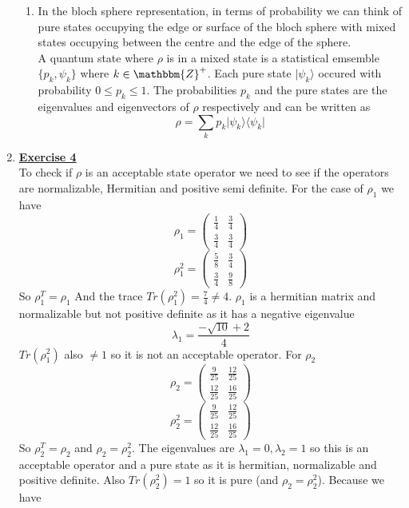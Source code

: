 \documentclass[12pt]{article}
\newcommand{\ket}[1]{\vert{#1}\rangle}
\newcommand{\bra}[1]{\langle{#1}\vert}
\begin{document}
\begin{enumerate}
\begin{enumerate}
    \item In the bloch sphere representation, in terms of probability we can think of pure states occupying the edge or surface of the bloch sphere with mixed states occupying between the centre and the edge of the sphere. 
    \\
    A quantum state where $\rho$ is in a mixed state is a statistical emsemble $\{p_k, \psi_k\}$ where $k \in \mathbbm{Z}^+$. Each pure state $\ket{\psi_k}$ occured with probability $ 0 \leq p_k \leq 1$.
    The probabilities $p_k$ and the pure states are the eigenvalues and eigenvectors of $\rho$ respectively and can be written as 
    $$ \rho = \sum_k p_k \ket{\psi_k}\bra{\psi_k} $$
\end{enumerate}



\item \textbf{\underline{Exercise 4}} \\
To check if $\rho$ is an acceptable state operator we need to see if the operators are normalizable, Hermitian and positive semi definite. For the case of $\rho_1$ we have 
$$ \rho_1 = \left(\begin{array}{cc} \frac{1}{4} & \frac{3}{4} \\ \frac{3}{4} & \frac{3}{4} \end{array}\right)$$
$$ \rho_1^2 = \left(\begin{array}{cc} \frac{5}{8} & \frac{3}{4} \\ \frac{3}{4} & \frac{9}{8} \end{array}\right)$$
So $\rho_1^T = \rho_1$ And the trace $Tr(\rho_1^2) = \frac{7}{4} \neq 4$. $\rho_1$ is a hermitian matrix and normalizable but not positive definite as it has a negative eigenvalue 
$$ \lambda_1 = \frac{- \sqrt{10} +2}{4} $$
$Tr(\rho_1^2)$ also $\neq 1$ so it is not an acceptable operator. For $\rho_2$ 
$$ \rho_2 = \left(\begin{array}{cc} \frac{9}{25} & \frac{12}{25} \\ \frac{12}{25} & \frac{16}{25} \end{array}\right)$$
$$ \rho_2^2 = \left(\begin{array}{cc} \frac{9}{25} & \frac{12}{25} \\ \frac{12}{25} & \frac{16}{25} \end{array}\right)$$
So $\rho_2^T = \rho_2 $ and $\rho_2 = \rho_2^2$. The eigenvalues are $\lambda_1 =0, \lambda_2 = 1$ so this is an acceptable operator and a pure state as it is hermitian, normalizable and positive definite. Also $Tr(\rho_2^2) =1$ so it is pure (and $\rho_2 = \rho_2^2$). Because we have 

\end{enumerate}
\end{document}

